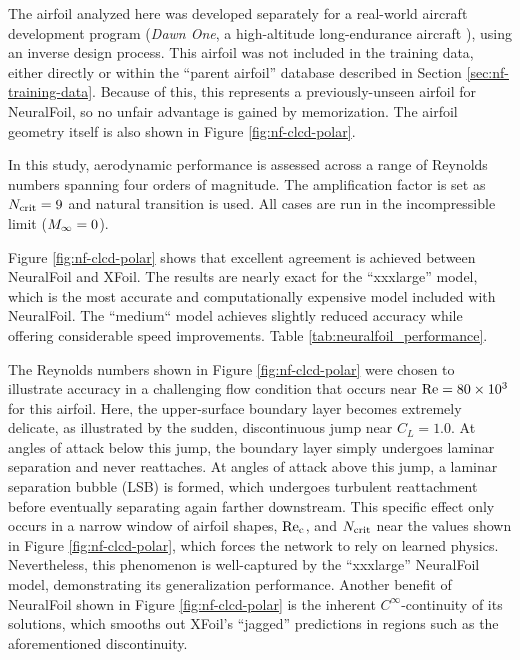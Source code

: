     The airfoil analyzed here was developed separately for a real-world aircraft development program (\emph{Dawn One}, a high-altitude long-endurance aircraft \cite{sharpe_optimization_2021, sharpe_tailerons_2023}), using an inverse design process. This airfoil was not included in the training data, either directly or within the ``parent airfoil'' database described in Section \ref{sec:nf-training-data}. Because of this, this represents a previously-unseen airfoil for NeuralFoil, so no unfair advantage is gained by memorization. The airfoil geometry itself is also shown in Figure \ref{fig:nf-clcd-polar}.

    In this study, aerodynamic performance is assessed across a range of Reynolds numbers spanning four orders of magnitude. The amplification factor is set as $N_{\rm crit}=9$ and natural transition is used. All cases are run in the incompressible limit ($M_\infty=0$).

    Figure \ref{fig:nf-clcd-polar} shows that excellent agreement is achieved between NeuralFoil and XFoil. The results are nearly exact for the ``xxxlarge'' model, which is the most accurate and computationally expensive model included with NeuralFoil. The ``medium`` model achieves slightly reduced accuracy while offering considerable speed improvements. Table \ref{tab:neuralfoil_performance}.

    The Reynolds numbers shown in Figure \ref{fig:nf-clcd-polar} were chosen to illustrate accuracy in a challenging flow condition that occurs near $\rm Re=80 \times 10^3$ for this airfoil. Here, the upper-surface boundary layer becomes extremely delicate, as illustrated by the sudden, discontinuous jump near $C_L=1.0$. At angles of attack below this jump, the boundary layer simply undergoes laminar separation and never reattaches. At angles of attack above this jump, a laminar separation bubble (LSB) is formed, which undergoes turbulent reattachment before eventually separating again farther downstream. This specific effect only occurs in a narrow window of airfoil shapes, $\rm Re_c$, and $N_{\rm crit}$ near the values shown in Figure \ref{fig:nf-clcd-polar}, which forces the network to rely on learned physics. Nevertheless, this phenomenon is well-captured by the ``xxxlarge'' NeuralFoil model, demonstrating its generalization performance. Another benefit of NeuralFoil shown in Figure \ref{fig:nf-clcd-polar} is the inherent $C^\infty$-continuity of its solutions, which smooths out XFoil's ``jagged'' predictions in regions such as the aforementioned discontinuity.

